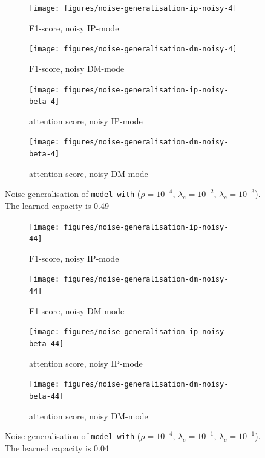 \begin{figure}[!h]
\centering
\begin{subfigure}{.5\textwidth}
  \centering
  \texttt{[image: figures/noise-generalisation-ip-noisy-4]}
  \caption{F1-score, noisy IP-mode}
  \label{fig:exp-att-shift-7-a}
\end{subfigure}%
\begin{subfigure}{.5\textwidth}
  \centering
  \texttt{[image: figures/noise-generalisation-dm-noisy-4]}
  \caption{F1-score, noisy DM-mode}
\end{subfigure}
\begin{subfigure}{.5\textwidth}
  \centering
  \texttt{[image: figures/noise-generalisation-ip-noisy-beta-4]}
  \caption{attention score, noisy IP-mode}
\end{subfigure}%
\begin{subfigure}{.5\textwidth}
  \centering
  \texttt{[image: figures/noise-generalisation-dm-noisy-beta-4]}
  \caption{attention score, noisy DM-mode}
\end{subfigure}
\caption{Noise generalisation of \texttt{model-with} ($\rho=10^{-4},\,\lambda_e=10^{-2},\,\lambda_c=10^{-3}$). The learned capacity is 0.49}
\label{fig:exp-att-shift-7}
\end{figure}

\begin{figure}[!h]
\centering
\begin{subfigure}{.5\textwidth}
  \centering
  \texttt{[image: figures/noise-generalisation-ip-noisy-44]}
  \caption{F1-score, noisy IP-mode}
\end{subfigure}%
\begin{subfigure}{.5\textwidth}
  \centering
  \texttt{[image: figures/noise-generalisation-dm-noisy-44]}
  \caption{F1-score, noisy DM-mode}
\end{subfigure}
\begin{subfigure}{.5\textwidth}
  \centering
  \texttt{[image: figures/noise-generalisation-ip-noisy-beta-44]}
  \caption{attention score, noisy IP-mode}
\end{subfigure}%
\begin{subfigure}{.5\textwidth}
  \centering
  \texttt{[image: figures/noise-generalisation-dm-noisy-beta-44]}
  \caption{attention score, noisy DM-mode}
\end{subfigure}
\caption{Noise generalisation of \texttt{model-with} ($\rho=10^{-4},\,\lambda_e=10^{-1},\,\lambda_c=10^{-1}$). The learned capacity is 0.04}
\label{fig:exp-att-shift-8}
\end{figure}


